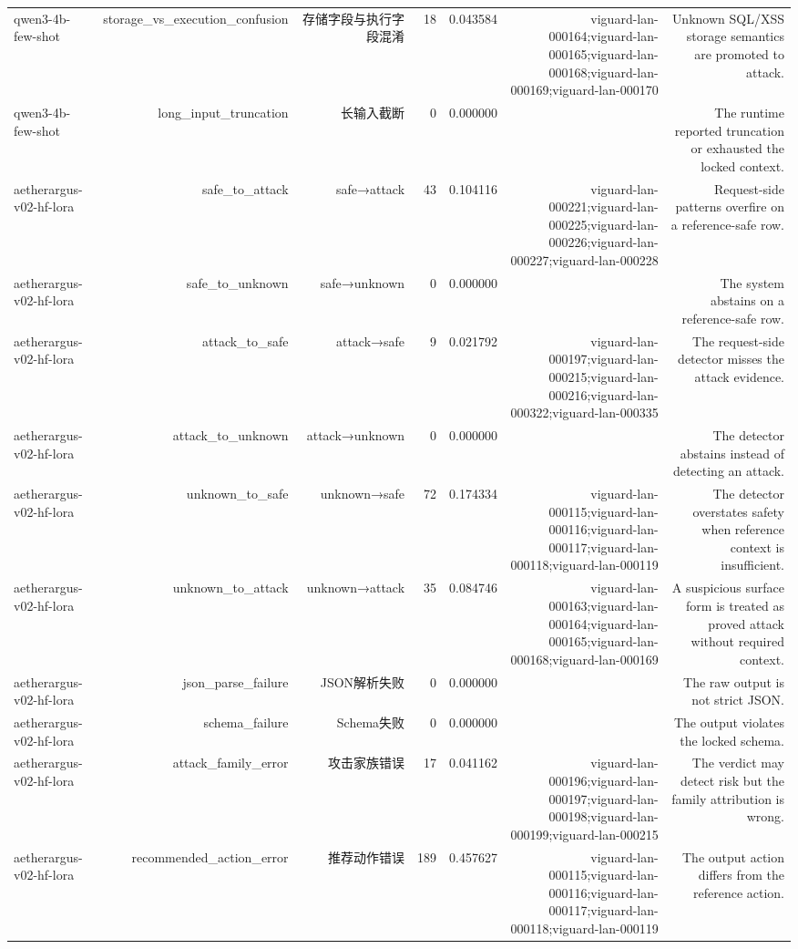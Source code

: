 \begin{table}[t]
\begin{tabular}{lrrrrrr}
qwen3-4b-few-shot & storage\_vs\_execution\_confusion & 存储字段与执行字段混淆 & 18 & 0.043584 & viguard-lan-000164;viguard-lan-000165;viguard-lan-000168;viguard-lan-000169;viguard-lan-000170 & Unknown SQL/XSS storage semantics are promoted to attack. \\
qwen3-4b-few-shot & long\_input\_truncation & 长输入截断 & 0 & 0.000000 &  & The runtime reported truncation or exhausted the locked context. \\
aetherargus-v02-hf-lora & safe\_to\_attack & safe→attack & 43 & 0.104116 & viguard-lan-000221;viguard-lan-000225;viguard-lan-000226;viguard-lan-000227;viguard-lan-000228 & Request-side patterns overfire on a reference-safe row. \\
aetherargus-v02-hf-lora & safe\_to\_unknown & safe→unknown & 0 & 0.000000 &  & The system abstains on a reference-safe row. \\
aetherargus-v02-hf-lora & attack\_to\_safe & attack→safe & 9 & 0.021792 & viguard-lan-000197;viguard-lan-000215;viguard-lan-000216;viguard-lan-000322;viguard-lan-000335 & The request-side detector misses the attack evidence. \\
aetherargus-v02-hf-lora & attack\_to\_unknown & attack→unknown & 0 & 0.000000 &  & The detector abstains instead of detecting an attack. \\
aetherargus-v02-hf-lora & unknown\_to\_safe & unknown→safe & 72 & 0.174334 & viguard-lan-000115;viguard-lan-000116;viguard-lan-000117;viguard-lan-000118;viguard-lan-000119 & The detector overstates safety when reference context is insufficient. \\
aetherargus-v02-hf-lora & unknown\_to\_attack & unknown→attack & 35 & 0.084746 & viguard-lan-000163;viguard-lan-000164;viguard-lan-000165;viguard-lan-000168;viguard-lan-000169 & A suspicious surface form is treated as proved attack without required context. \\
aetherargus-v02-hf-lora & json\_parse\_failure & JSON解析失败 & 0 & 0.000000 &  & The raw output is not strict JSON. \\
aetherargus-v02-hf-lora & schema\_failure & Schema失败 & 0 & 0.000000 &  & The output violates the locked schema. \\
aetherargus-v02-hf-lora & attack\_family\_error & 攻击家族错误 & 17 & 0.041162 & viguard-lan-000196;viguard-lan-000197;viguard-lan-000198;viguard-lan-000199;viguard-lan-000215 & The verdict may detect risk but the family attribution is wrong. \\
aetherargus-v02-hf-lora & recommended\_action\_error & 推荐动作错误 & 189 & 0.457627 & viguard-lan-000115;viguard-lan-000116;viguard-lan-000117;viguard-lan-000118;viguard-lan-000119 & The output action differs from the reference action. \\

\end{tabular}
\end{table}
